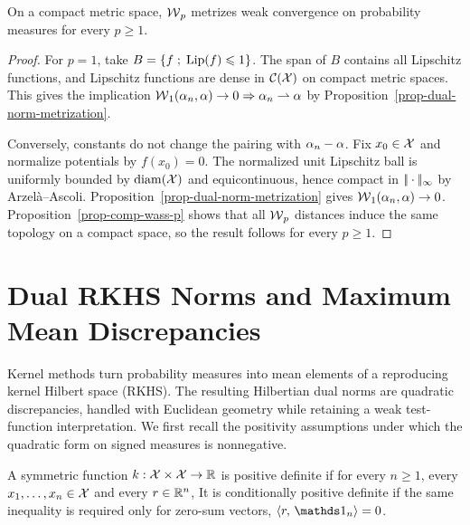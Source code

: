 \begin{cor}\label{cor-topol-wass}
	On a compact metric space, $\operatorname{\mathcal{W}}_p$ metrizes weak convergence on probability measures for every $p\geq1$.
\end{cor}
\begin{proof}
	For $p=1$, take $B=\left\{ f \;;\; \operatorname{Lip}(f)\leqslant1 \right\}$. The span of $B$ contains all Lipschitz functions, and Lipschitz functions are dense in $\mathcal{C}(\mathcal{X})$ on compact metric spaces. This gives the implication $\operatorname{\mathcal{W}}_1(\alpha_n,\alpha)\to0\Rightarrow \alpha_n\rightharpoonup\alpha$ by Proposition~\ref{prop-dual-norm-metrization}.

	Conversely, constants do not change the pairing with $\alpha_n-\alpha$. Fix $x_0\in\mathcal{X}$ and normalize potentials by $f(x_0)=0$. The normalized unit Lipschitz ball is uniformly bounded by $\mathrm{diam}(\mathcal{X})$ and equicontinuous, hence compact in $|\!| \cdot |\!|_\infty$ by Arzel\`a--Ascoli. Proposition~\ref{prop-dual-norm-metrization} gives $\operatorname{\mathcal{W}}_1(\alpha_n,\alpha)\to0$. Proposition~\ref{prop-comp-wass-p} shows that all $\operatorname{\mathcal{W}}_p$ distances induce the same topology on a compact space, so the result follows for every $p\geq1$.
\end{proof}

\section{Dual RKHS Norms and Maximum Mean Discrepancies}
\label{sec-rkhs-mmd}

Kernel methods turn probability measures into mean elements of a reproducing kernel Hilbert space (RKHS). The resulting Hilbertian dual norms are quadratic discrepancies, handled with Euclidean geometry while retaining a weak test-function interpretation. We first recall the positivity assumptions under which the quadratic form on signed measures is nonnegative.

\begin{defn}\label{def-positive-kernels}
	A symmetric function $k:\mathcal{X}\times\mathcal{X}\to\mathbb{R}$ is positive definite if for every $n\geq1$, every $x_1,\ldots,x_n\in\mathcal{X}$ and every $r\in\mathbb{R}^n$,
	It is conditionally positive definite if the same inequality is required only for zero-sum vectors, $\dotp{r}{\ones_n}=0$.
\end{defn}

